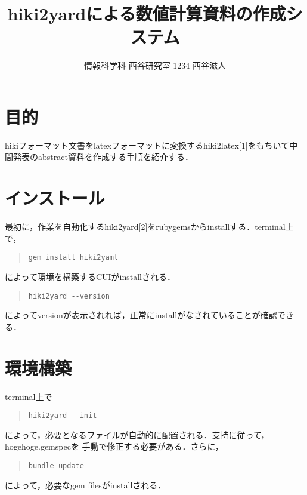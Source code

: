 \documentclass[10pt,a4j,twocolumn]{jsarticle}
\begin{document}
\title{hiki2yardによる数値計算資料の作成システム}
\author{情報科学科 西谷研究室 1234 西谷滋人}
\date{}
\maketitle
\section{目的}
hikiフォーマット文書をlatexフォーマットに変換するhiki2latex[1]をもちいて中間発表のabstract資料を作成する手順を紹介する．

\section{インストール}
最初に，作業を自動化するhiki2yard[2]をrubygemsからinstallする．terminal上で，
\begin{quote}\begin{verbatim}
gem install hiki2yaml
\end{verbatim}\end{quote}
によって環境を構築するCUIがinstallされる．
\begin{quote}\begin{verbatim}
hiki2yard --version
\end{verbatim}\end{quote}
によってversionが表示されれば，正常にinstallがなされていることが確認できる．

\section{環境構築}
terminal上で
\begin{quote}\begin{verbatim}
hiki2yard --init
\end{verbatim}\end{quote}
によって，必要となるファイルが自動的に配置される．支持に従って，hogehoge.gemspecを
手動で修正する必要がある．さらに，
\begin{quote}\begin{verbatim}
bundle update
\end{verbatim}\end{quote}
によって，必要なgem filesがinstallされる．
\end{document}
